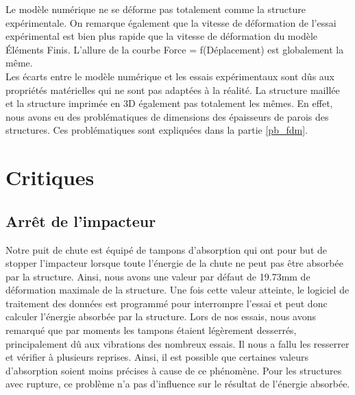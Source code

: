 \documentclass[a4paper]{article}
\begin{document}
	\hspace{0.5cm}Le modèle numérique ne se déforme pas totalement comme la structure expérimentale. On remarque également que la vitesse de déformation de l'essai expérimental est bien plus rapide que la vitesse de déformation du modèle  Éléments Finis. L'allure de la courbe Force = f(Déplacement) est globalement la même.\\
	
	\hspace{0.5cm}Les écarts entre le modèle numérique et les essais expérimentaux sont dûs aux propriétés matérielles qui ne sont pas adaptées à la réalité. La structure maillée et la structure imprimée en 3D également pas totalement les mêmes. En effet, nous avons eu des problématiques de dimensions des épaisseurs de parois des structures. Ces problématiques sont expliquées dans la partie \ref{pb_fdm}.
	\newpage
	
	
	\section{Critiques}
	\subsection{Arrêt de l'impacteur}
	
	\hspace{0.5cm}Notre puit de chute est équipé de tampons d'absorption qui ont pour but de stopper l’impacteur lorsque toute l’énergie de la chute ne peut pas être absorbée par la structure. 
	Ainsi, nous avons une valeur par défaut de 19.73mm de déformation maximale de la structure. Une fois cette valeur atteinte, le logiciel de traitement des données est programmé pour interrompre l’essai et peut donc calculer l’énergie absorbée par la structure. 
	Lors de nos essais, nous avons remarqué que par moments les tampons étaient légèrement desserrés, principalement dû aux vibrations des nombreux essais. Il nous a fallu les resserrer et vérifier à plusieurs reprises. Ainsi, il est possible que certaines valeurs d'absorption soient moins précises à cause de ce phénomène. 
	Pour les structures avec rupture, ce problème n’a pas d'influence sur le résultat de l’énergie absorbée.
	
\end{document}
